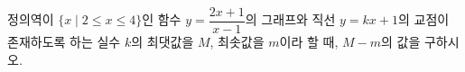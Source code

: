 \hspace*{2mm}\begin{minipage}[t]{\dimexpr\linewidth-2mm\relax}\vspace{0pt}
정의역이 $\{x \mid 2\le x\le 4\}$인 함수 $y=\dfrac{2x+1}{x-1}$의 그래프와 직선 $y=kx+1$의 교점이 존재하도록 하는 실수 $k$의 최댓값을 $M$, 최솟값을 $m$이라 할 때, $M-m$의 값을 구하시오.\end{minipage}
